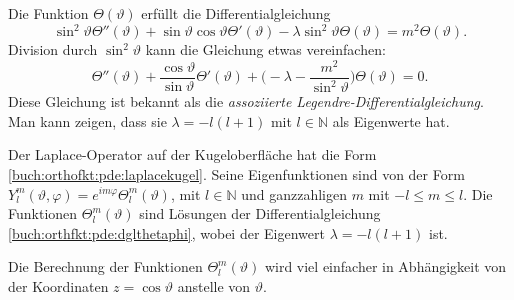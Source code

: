 Die Funktion $\Theta(\vartheta)$ erfüllt die Differentialgleichung
\[
\sin^2\vartheta \Theta''(\vartheta)
+
\sin\vartheta\cos\vartheta
\Theta'(\vartheta)
-
\lambda\sin^2\vartheta
\Theta(\vartheta)
=
m^2 \Theta(\vartheta).
\]
Division durch $\sin^2\vartheta$ kann die Gleichung etwas vereinfachen:
\begin{equation}
\Theta''(\vartheta)
+
\frac{\cos\vartheta}{\sin\vartheta} \Theta'(\vartheta)
+\biggl(
-
\lambda
-
\frac{m^2}{\sin^2\vartheta} 
\biggr)
\Theta(\vartheta)
=
0.
\label{buch:orthfkt:pde:dglthetaphi}
\end{equation}
Diese Gleichung ist bekannt als die {\em assoziierte
Legendre-Differentialgleichung}.
Man kann zeigen, dass sie $\lambda=-l(l+1)$ mit $l\in\mathbb{N}$
als Eigenwerte hat.

\begin{satz}
\label{buch:orthofkt:pde:satz:kugel}
Der Laplace-Operator auf der Kugeloberfläche hat die Form
\eqref{buch:orthofkt:pde:laplacekugel}.
Seine Eigenfunktionen sind von der Form
$Y_l^m(\vartheta,\varphi)=e^{im\varphi}\Theta_l^m(\vartheta)$,
mit $l\in \mathbb{N}$ und ganzzahligen $m$ mit $-l\le m\le l$.
Die Funktionen $\Theta_l^m(\vartheta)$ sind Lösungen der
Differentialgleichung \eqref{buch:orthfkt:pde:dglthetaphi}, wobei
der Eigenwert $\lambda = -l(l+1)$ ist.
\end{satz}

Die Berechnung der Funktionen $\Theta_l^m(\vartheta)$ wird viel
einfacher in Abhängigkeit von der Koordinaten $z=\cos\vartheta$
anstelle von $\vartheta$.

%
%
